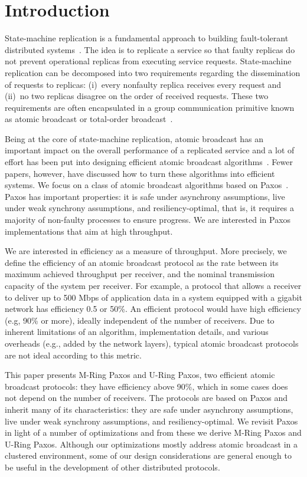 \documentclass[final,3p,times,twocolumn,authoryear]{elsarticle}
\begin{document}
\section{Introduction}
\label{sec:intro}

State-machine replication is a fundamental approach to building fault-tolerant distributed systems~\cite{Lam78,Sch93}. 
The idea is to replicate a service so that faulty replicas do not prevent operational replicas from executing service requests. 
State-machine replication can be decomposed into two requirements regarding the dissemination of requests to replicas: 
(i)~every nonfaulty replica receives every request and (ii)~no two replicas disagree on the order of received requests. 
These two requirements are often encapsulated in a group communication primitive known as atomic broadcast or total-order broadcast~\cite{HT93}.

Being at the core of state-machine replication, atomic broadcast has an important impact on the overall performance of a replicated service and a lot of effort has been put into designing efficient atomic broadcast algorithms~\cite{DUS04}. 
Fewer papers, however, have discussed how to turn these algorithms into efficient systems. 
We focus on a class of atomic broadcast algorithms based on Paxos~\cite{Lam98}.
Paxos has important properties: it is safe under asynchrony assumptions, live under weak synchrony assumptions, and resiliency-optimal, that is, it requires a majority of non-faulty processes to ensure progress.
We are interested in Paxos implementations that aim at high throughput.


We are interested in efficiency as a measure of throughput. 
More precisely, we define the efficiency of an atomic broadcast protocol as the rate between its maximum achieved throughput per receiver, and the nominal transmission capacity of the system per receiver. 
For example, a protocol that allows a receiver to deliver up to 500 Mbps of application data in a system equipped with a gigabit network has efficiency 0.5 or 50\%. 
An efficient protocol would have high efficiency (e.g, 90\% or more), ideally independent of the number of receivers.
Due to inherent limitations of an algorithm, implementation details, and various overheads (e.g., added by the network layers), typical atomic broadcast protocols are not ideal according to this metric.

This paper presents M-Ring Paxos and U-Ring Paxos, two efficient atomic broadcast protocols: they have efficiency above 90\%, which in some cases does not depend on the number of receivers. 
The protocols are based on Paxos and inherit many of its characteristics: they are safe under asynchrony assumptions, live under weak synchrony assumptions, and resiliency-optimal. 
We revisit Paxos in light of a number of optimizations and from these we derive M-Ring Paxos and U-Ring Paxos.
Although our optimizations mostly address atomic broadcast in a clustered environment, some of our design considerations are general enough to be useful in the development of other distributed protocols.
\end{document}
